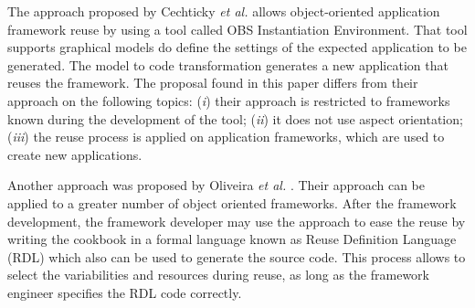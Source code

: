  The approach proposed by Cechticky \textit{et al.}  \citep{Cechticky:2003:GAF:954186.954203} allows object-oriented application framework reuse by using a tool called OBS Instantiation Environment. That tool supports graphical models do define the settings of the expected application to be generated. The model to code transformation generates a new application  that reuses the framework. The proposal found in this paper differs from their approach on the following topics: (\textit{i}) their approach is restricted to frameworks known during the development of the tool; (\textit{ii}) it does not use aspect orientation; (\textit{iii}) the reuse process is applied on application frameworks, %
which are used to create new applications.


 Another approach was proposed by Oliveira \textit{et al.}  \citep{Oliveira:2011:RET:2039458.2039832}. Their approach can be applied to a greater number of object oriented frameworks. After the framework development, the framework developer may use the approach to ease the reuse by writing the cookbook in a formal language known as Reuse Definition Language (RDL) which also can be used to generate the source code.
This process allows to select the variabilities and resources during reuse, as long as the framework engineer specifies the RDL code correctly.